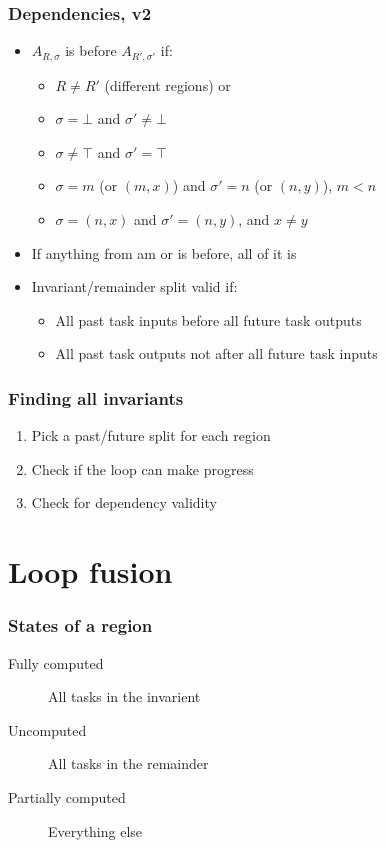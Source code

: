 \documentclass{beamer}
\begin{document}
\begin{frame}
  \frametitle{Dependencies, v2}
  \begin{itemize}
  \item $A_{R, \sigma}$ is before $A_{R', \sigma'}$ if:
    \begin{itemize}
    \item $R \neq R'$ (different regions) or
    \item $\sigma = \bot$ and $\sigma' \neq \bot$
    \item $\sigma \neq \top$ and $\sigma' = \top$
    \item $\sigma = m$ (or $(m, x)$) and $\sigma' = n$ (or $(n, y)$), $m < n$
    \item $\sigma = (n, x)$ and $\sigma' = (n, y)$, and $x \neq y$
    \end{itemize}
  \item If anything from am or is before, all of it is
  \item Invariant/remainder split valid if:
    \begin{itemize}
    \item All past task inputs before all future task outputs
    \item All past task outputs not after all future task inputs
    \end{itemize}
  \end{itemize}
\end{frame}

\begin{frame}
  \frametitle{Finding all invariants}
  \begin{enumerate}
  \item Pick a past/future split for each region
  \item Check if the loop can make progress
  \item Check for dependency validity
  \end{enumerate}
\end{frame}

\section{Loop fusion}

\frame{\sectionpage}

\begin{frame}
  \frametitle{States of a region}
  \begin{description}
  \item[Fully computed] All tasks in the invarient
  \item[Uncomputed] All tasks in the remainder
  \item[Partially computed] Everything else
  \end{description}
\end{frame}
\end{document}
